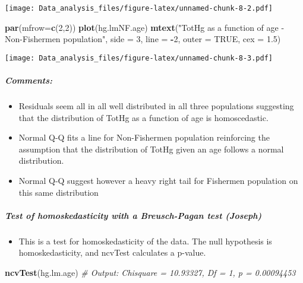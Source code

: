 \documentclass[12pt,]{article}
\newenvironment{Shaded}{\begin{snugshade}}{\end{snugshade}}
\newcommand{\KeywordTok}[1]{\textcolor[rgb]{0.13,0.29,0.53}{\textbf{#1}}}
\newcommand{\DataTypeTok}[1]{\textcolor[rgb]{0.13,0.29,0.53}{#1}}
\newcommand{\DecValTok}[1]{\textcolor[rgb]{0.00,0.00,0.81}{#1}}
\newcommand{\FloatTok}[1]{\textcolor[rgb]{0.00,0.00,0.81}{#1}}
\newcommand{\StringTok}[1]{\textcolor[rgb]{0.31,0.60,0.02}{#1}}
\newcommand{\CommentTok}[1]{\textcolor[rgb]{0.56,0.35,0.01}{\textit{#1}}}
\newcommand{\OtherTok}[1]{\textcolor[rgb]{0.56,0.35,0.01}{#1}}
\newcommand{\OperatorTok}[1]{\textcolor[rgb]{0.81,0.36,0.00}{\textbf{#1}}}
\newcommand{\NormalTok}[1]{#1}
\providecommand{\tightlist}{%
  \setlength{\itemsep}{0pt}\setlength{\parskip}{0pt}}
\let\oldsubparagraph\subparagraph
\renewcommand{\subparagraph}[1]{\oldsubparagraph{#1}\mbox{}}
\begin{document}
\texttt{[image: Data\_analysis\_files/figure-latex/unnamed-chunk-8-2.pdf]}

\begin{Shaded}
\begin{Highlighting}[]
\KeywordTok{par}\NormalTok{(}\DataTypeTok{mfrow=}\KeywordTok{c}\NormalTok{(}\DecValTok{2}\NormalTok{,}\DecValTok{2}\NormalTok{))}
\KeywordTok{plot}\NormalTok{(hg.lmNF.age)}
\KeywordTok{mtext}\NormalTok{(}\StringTok{"TotHg as a function of age - Non-Fishermen population"}\NormalTok{, }\DataTypeTok{side =} \DecValTok{3}\NormalTok{, }\DataTypeTok{line =} \OperatorTok{-}\DecValTok{2}\NormalTok{, }\DataTypeTok{outer =} \OtherTok{TRUE}\NormalTok{, }\DataTypeTok{cex =} \FloatTok{1.5}\NormalTok{)}
\end{Highlighting}
\end{Shaded}

\texttt{[image: Data\_analysis\_files/figure-latex/unnamed-chunk-8-3.pdf]}

\subparagraph{Comments:}\label{comments}

\begin{itemize}
\tightlist
\item
  Residuals seem all in all well distributed in all three populations
  suggesting that the distribution of TotHg as a function of age is
  homoscedastic.
\item
  Normal Q-Q fits a line for Non-Fishermen population reinforcing the
  assumption that the distribution of TotHg given an age follows a
  normal distribution.
\item
  Normal Q-Q suggest however a heavy right tail for Fishermen population
  on this same distribution
\end{itemize}

\subparagraph{Test of homoskedasticity with a Breusch-Pagan test
(Joseph)}\label{test-of-homoskedasticity-with-a-breusch-pagan-test-joseph}

\begin{itemize}
\tightlist
\item
  This is a test for homoskedasticity of the data. The null hypothesis
  is homoskedasticity, and ncvTest calculates a p-value.
\end{itemize}

\begin{Shaded}
\begin{Highlighting}[]
\KeywordTok{ncvTest}\NormalTok{(hg.lm.age) }\CommentTok{# Output: Chisquare = 10.93327, Df = 1, p = 0.00094453}
\end{Highlighting}
\end{Shaded}
\end{document}
